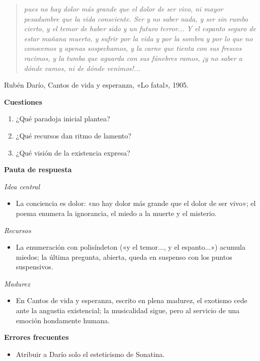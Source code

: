 \documentclass{book}
\begin{document}
\begin{quote}
\itshape pues no hay dolor más grande que el dolor de ser vivo, ni mayor pesadumbre que la vida consciente. Ser y no saber nada, y ser sin rumbo cierto, y el temor de haber sido y un futuro terror... Y el espanto seguro de estar mañana muerto, y sufrir por la vida y por la sombra y por lo que no conocemos y apenas sospechamos, y la carne que tienta con sus frescos racimos, y la tumba que aguarda con sus fúnebres ramos, ¡y no saber a dónde vamos, ni de dónde venimos!...
\end{quote}
{\noindent\footnotesize Rubén Darío, Cantos de vida y esperanza, «Lo fatal», 1905.\par}

\noindent\textbf{Cuestiones}
\begin{enumerate}
\item ¿Qué paradoja inicial plantea?
\item ¿Qué recursos dan ritmo de lamento?
\item ¿Qué visión de la existencia expresa?
\end{enumerate}

\noindent\textbf{Pauta de respuesta}

\noindent\textit{Idea central}
\begin{itemize}
\item La conciencia es dolor: «no hay dolor más grande que el dolor de ser vivo»; el poema enumera la ignorancia, el miedo a la muerte y el misterio.
\end{itemize}

\noindent\textit{Recursos}
\begin{itemize}
\item La enumeración con polisíndeton («y el temor..., y el espanto...») acumula miedos; la última pregunta, abierta, queda en suspenso con los puntos suspensivos.
\end{itemize}

\noindent\textit{Madurez}
\begin{itemize}
\item En Cantos de vida y esperanza, escrito en plena madurez, el exotismo cede ante la angustia existencial; la musicalidad sigue, pero al servicio de una emoción hondamente humana.
\end{itemize}

\noindent\textbf{Errores frecuentes}
\begin{itemize}
\item Atribuir a Darío solo el esteticismo de Sonatina.
\end{itemize}
\end{document}
